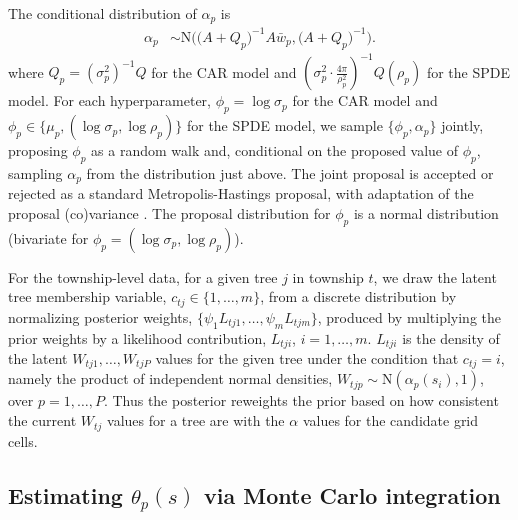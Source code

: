 \documentclass[12pt]{article}
\begin{document}
The conditional distribution of $\alpha_{p}$ is 
\begin{align}
\alpha_{p} & \sim\mbox{N}\bigg(\Big(A+Q_{p}\Big)^{-1}A\bar{w}_{p},\Big(A+Q_{p}\Big)^{-1}\bigg).\label{sampalpha}
\end{align}
where $Q_{p}=(\sigma_{p}^{2})^{-1}Q$ for the CAR model and $\left(\sigma_{p}^{2}\cdot\frac{4\pi}{\rho_{p}^{2}}\right)^{-1}Q(\rho_{p})$
for the SPDE model. For each hyperparameter, $\phi_{p}=\log\sigma_{p}$
for the CAR model and $\phi_{p}\in\{\mu_{p},(\log\sigma_{p},\log\rho_{p})\}$
for the SPDE model, we sample $\{\phi_{p},\alpha_{p}\}$ jointly,
proposing $\phi_{p}$ as a random walk and, conditional on the proposed
value of $\phi_{p}$, sampling $\alpha_{p}$ from the distribution
just above. The joint proposal is accepted or rejected as a standard
Metropolis-Hastings proposal, with adaptation of the proposal (co)variance
\citep{Shab:Well:2011}. The proposal distribution for $\phi_{p}$
is a normal distribution (bivariate for $\phi_{p}=(\log\sigma_{p},\log\rho_{p})$).

\noindent 

For the township-level data, for a given tree $j$ in township $t$,
we draw the latent tree membership variable, $c_{tj}\in\{1,\ldots,m\}$,
from a discrete distribution by normalizing posterior weights, $\{\psi_{1}L_{tj1},\ldots,\psi_{m}L_{tjm}\}$,
produced by multiplying the prior weights by a likelihood contribution,
$L_{tji}$, $i=1,\ldots,m$. $L_{tji}$ is the density of the latent
$W_{tj1},\ldots,W_{tjP}$ values for the given tree under the condition
that $c_{tj}=i$, namely the product of independent normal densities,
$W_{tjp}\sim\mbox{N}(\alpha_{p}(s_{i}),1)$, over $p=1,\ldots,P$.
Thus the posterior reweights the prior based on how consistent the
current $W_{tj}$ values for a tree are with the $\alpha$ values
for the candidate grid cells. 




\subsection{Estimating $\theta_{p}(s)$ via Monte Carlo integration}
\end{document}
